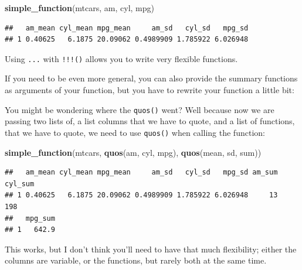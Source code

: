 \documentclass[]{gitbook}
\newenvironment{Shaded}{\begin{snugshade}}{\end{snugshade}}
\newcommand{\ControlFlowTok}[1]{\textcolor[rgb]{0.13,0.29,0.53}{\textbf{#1}}}
\newcommand{\KeywordTok}[1]{\textcolor[rgb]{0.13,0.29,0.53}{\textbf{#1}}}
\newcommand{\NormalTok}[1]{#1}
\newcommand{\OperatorTok}[1]{\textcolor[rgb]{0.81,0.36,0.00}{\textbf{#1}}}
\newcommand{\StringTok}[1]{\textcolor[rgb]{0.31,0.60,0.02}{#1}}
\theoremstyle{definition}
\theoremstyle{definition}
\theoremstyle{definition}
\theoremstyle{remark}
\begin{document}
\begin{Shaded}
\begin{Highlighting}[]
\KeywordTok{simple_function}\NormalTok{(mtcars, am, cyl, mpg)}
\end{Highlighting}
\end{Shaded}

\begin{verbatim}
##   am_mean cyl_mean mpg_mean     am_sd   cyl_sd   mpg_sd
## 1 0.40625   6.1875 20.09062 0.4989909 1.785922 6.026948
\end{verbatim}

Using \texttt{...} with \texttt{!!!()} allows you to write very flexible
functions.

If you need to be even more general, you can also provide the summary
functions as arguments of your function, but you have to rewrite your
function a little bit:

\begin{Shaded}
\end{Shaded}

You might be wondering where the \texttt{quos()} went? Well because now
we are passing two lists of, a list columns that we have to quote, and a
list of functions, that we have to quote, we need to use \texttt{quos()}
when calling the function:

\begin{Shaded}
\begin{Highlighting}[]
\KeywordTok{simple_function}\NormalTok{(mtcars, }\KeywordTok{quos}\NormalTok{(am, cyl, mpg), }\KeywordTok{quos}\NormalTok{(mean, sd, sum))}
\end{Highlighting}
\end{Shaded}

\begin{verbatim}
##   am_mean cyl_mean mpg_mean     am_sd   cyl_sd   mpg_sd am_sum cyl_sum
## 1 0.40625   6.1875 20.09062 0.4989909 1.785922 6.026948     13     198
##   mpg_sum
## 1   642.9
\end{verbatim}

This works, but I don't think you'll need to have that much flexibility;
either the columns are variable, or the functions, but rarely both at
the same time.
\end{document}
